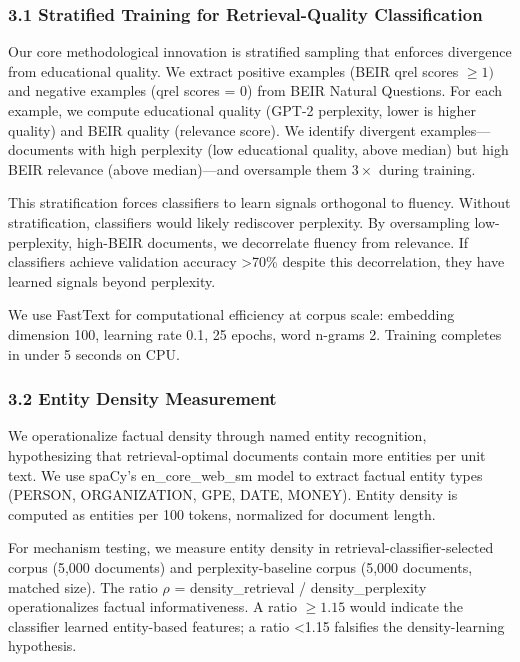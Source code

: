 
\subsubsection{3.1 Stratified Training for Retrieval-Quality Classification}

Our core methodological innovation is stratified sampling that enforces divergence from educational quality. We extract positive examples (BEIR qrel scores $\geq 1)$ and negative examples (qrel scores = 0) from BEIR Natural Questions. For each example, we compute educational quality (GPT-2 perplexity, lower is higher quality) and BEIR quality (relevance score). We identify divergent examples---documents with high perplexity (low educational quality, above median) but high BEIR relevance (above median)---and oversample them $3\times$ during training.

This stratification forces classifiers to learn signals orthogonal to fluency. Without stratification, classifiers would likely rediscover perplexity. By oversampling low-perplexity, high-BEIR documents, we decorrelate fluency from relevance. If classifiers achieve validation accuracy >70\% despite this decorrelation, they have learned signals beyond perplexity.

We use FastText \citep{Joulin2017} for computational efficiency at corpus scale: embedding dimension 100, learning rate 0.1, 25 epochs, word n-grams 2. Training completes in under 5 seconds on CPU.

\subsubsection{3.2 Entity Density Measurement}

We operationalize factual density through named entity recognition, hypothesizing that retrieval-optimal documents contain more entities per unit text. We use spaCy's en\_core\_web\_sm model to extract factual entity types (PERSON, ORGANIZATION, GPE, DATE, MONEY). Entity density is computed as entities per 100 tokens, normalized for document length.

For mechanism testing, we measure entity density in retrieval-classifier-selected corpus (5,000 documents) and perplexity-baseline corpus (5,000 documents, matched size). The ratio $\rho$ = density\_retrieval / density\_perplexity operationalizes factual informativeness. A ratio $\geq 1.15$ would indicate the classifier learned entity-based features; a ratio <1.15 falsifies the density-learning hypothesis.

